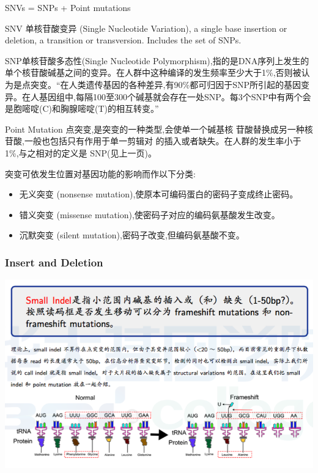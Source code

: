 \documentclass[12pt]{beamer}
\begin{document}
\begin{frame}%
  \begin{center}
    {  \large  SNVs = SNPs + Point mutations}
  \end{center}
  {\small
\begin{tcolorbox}[colback=backg!5,colframe=backg,title=SNV]
  SNV 单核苷酸变异 (Single Nucleotide Variation), a single base insertion or deletion, a transition or transversion. Includes the set of SNPs.
\end{tcolorbox}
\begin{tcolorbox}[colback=backg!5,colframe=backg,title=SNP]
  SNP单核苷酸多态性(Single Nucleotide Polymorphism),指的是DNA序列上发生的单个核苷酸碱基之间的变异。在人群中这种编译的发生频率至少大于1\%,否则被认为是点突变。“在人类遗传基因的各种差异,有90\%都可归因于SNP所引起的基因变异。在人基因组中,每隔100至300个碱基就会存在一处SNP。每3个SNP中有两个会是胞嘧啶(C)和胸腺嘧啶(T)的相互转变。”
  \end{tcolorbox}
  }

\end{frame}

\begin{frame}
  \begin{tcolorbox}[colback=backg!5,colframe=backg,title=Point mutations]
   Point Mutation 点突变,是突变的一种类型,会使单一个碱基核 苷酸替换成另一种核苷酸,一般也包括只有作用于单一剪辑对 的插入或者缺失。在人群的发生率小于 1\%,与之相对的定义是 SNP(见上一页)。
  \end{tcolorbox}
  突变可依发生位置对基因功能的影响而作以下分类:
  \begin{itemize}
  \item 无义突变 (nonsense mutation),使原本可编码蛋白的密码子变成终止密码。
  \item 错义突变 (missense mutation),使密码子对应的编码氨基酸发生改变。
  \item 沉默突变 (silent mutation),密码子改变,但编码氨基酸不变。
  \end{itemize}
\end{frame}

\begin{frame}\frametitle{Insert and Deletion}
  \includegraphics[width=\textwidth]{figures/old_slides/indel.png}
\end{frame}
\end{document}
